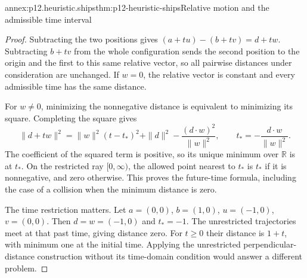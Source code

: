 \begin{annexitem}{annex:p12.heuristic.ships}{thm:p12-heuristic-ships}{Relative motion and the admissible time interval}
\begin{proof}
Subtracting the two positions gives
\((a+tu)-(b+tv)=d+tw\). Subtracting \(b+tv\) from the
whole configuration sends the second position to the origin
and the first to this same relative vector, so all pairwise
distances under consideration are unchanged. If \(w=0\),
the relative vector is constant and every admissible time
has the same distance.

For \(w\ne0\), minimizing the nonnegative distance is equivalent
to minimizing its square. Completing the square gives
\[
 \|d+tw\|^2
 =\|w\|^2(t-t_*)^2+
       \|d\|^2-\frac{(d\cdot w)^2}{\|w\|^2},
 \qquad t_*=-\frac{d\cdot w}{\|w\|^2}.
\]
The coefficient of the squared term is positive, so its unique
minimum over \(\mathbb R\) is at \(t_*\). On the restricted
ray \([0,\infty)\), the allowed point nearest to \(t_*\)
is \(t_*\) if it is nonnegative, and zero otherwise.
This proves the future-time formula, including the case of
a collision when the minimum distance is zero.

The time restriction matters. Let \(a=(0,0)\), \(b=(1,0)\),
\(u=(-1,0)\), \(v=(0,0)\). Then \(d=w=(-1,0)\)
and \(t_*=-1\). The unrestricted trajectories meet at that
past time, giving distance zero. For \(t\ge0\) their distance
is \(1+t\), with minimum one at the initial time. Applying the
unrestricted perpendicular-distance construction without its
time-domain condition would answer a different problem.
\end{proof}
\end{annexitem}
